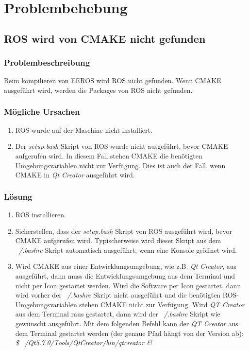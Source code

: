 \chapter{Problembehebung}


\section{ROS wird von CMAKE nicht gefunden}
\subsection{Problembeschreibung}
Beim kompilieren von EEROS wird ROS nicht gefunden.
Wenn CMAKE ausgeführt wird, werden die Packages von ROS nicht gefunden.

\subsection{Mögliche Ursachen}
\begin{enumerate}
\item ROS wurde auf der Maschine nicht installiert.
\item Der \textit{setup.bash} Skript von ROS wurde nicht ausgeführt, bevor CMAKE aufgerufen wird.
In diesem Fall stehen CMAKE die benötigten Umgebungsvariablen nicht zur Verfügung.
Dies ist auch der Fall, wenn CMAKE in \textit{Qt Creator} ausgeführt wird.
\end{enumerate}

\subsection{Lösung}
\begin{enumerate}
\item ROS installieren.
\item Sicherstellen, dass der \textit{setup.bash} Skript von ROS ausgeführt wird, bevor CMAKE aufgerufen wird.
Typischerweise wird dieser Skript aus dem \textit{~/.bashrc} Skript automatisch ausgeführt, wenn eine Konsole geöffnet wird.
\item Wird CMAKE aus einer Entwicklungsumgebung, wie z.B. \textit{Qt Creator}, aus ausgeführt, dann muss die Entwicklungsumgebung aus dem Terminal und nicht per Icon gestartet werden.
Wird die Software per Icon gestartet, dann wird vorher der \textit{~/.bashrc} Skript nicht ausgeführt und die benötigten ROS-Umgebungsvariablen stehen CMAKE nicht zur Verfügung.
Wird \textit{QT Creator} aus dem Terminal raus gestartet, dann wird der \textit{~/.bashrc} Skript wie gewünscht ausgeführt.
Mit dem folgenden Befehl kann der \textit{QT Creator} aus dem Terminal gestartet werden (der genaue Pfad hängt von der Version ab):\\
\textit{\$ ~/Qt5.7.0/Tools/QtCreator/bin/qtcreator \&}
\end{enumerate}


